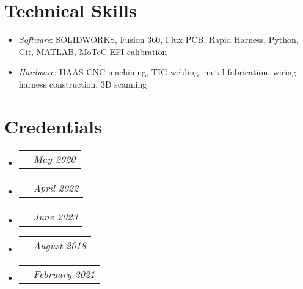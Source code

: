 \documentclass[letterpaper,11pt]{article}
\makeatletter
\newcommand{\role}[2]{
  \vspace{-5pt}\item
    \begin{tabular*}{1.0\textwidth}[t]{l@{\extracolsep{\fill}}r}
      \textit{\small#1} & \textit{\small #2} \\
    \end{tabular*}\vspace{-7pt}
}
\newcommand{\resumeItem}[1]{
  \item\small{
    {#1 \vspace{-2pt}}
  }
}
\newcommand{\credential}[2]{
  \item
    \begin{tabular*}{0.94\textwidth}[t]{l@{\extracolsep{\fill}}r}
      \text{\small#1} & \textit{\small #2} \\
    \end{tabular*}\vspace{-7pt}
}
\newcommand{\resumeItemListStart}{\begin{itemize}}
\newcommand{\resumeItemListEnd}{\end{itemize}\vspace{-5pt}}
\newcommand{\credentialListStart}{\begin{itemize}}
\newcommand{\credentialListEnd}{\end{itemize}\vspace{-5pt}}
\makeatother
\begin{document}
            
\section{Technical Skills}
    \resumeItemListStart
        \resumeItem{\textit{Software}{: SOLIDWORKS, Fusion 360, Flux PCB, Rapid Harness, Python, Git, MATLAB, MoTeC EFI calibration}} \vspace{-5pt}
        \resumeItem{\textit{Hardware}{: HAAS CNC machining, TIG welding, metal fabrication, wiring harness construction, 3D scanning}}
    \resumeItemListEnd
 \vspace{-16pt}

\section{Credentials}
    \credentialListStart
        \credential{Certified SOLIDWORKS Associate (CSWA) - Mechanical Design}{May 2020}
        \credential{Certified SOLIDWORKS Associate (CSWA) - Simulation}{April 2022}
        \credential{SCCA (Sports Car Club of America) Reg Scrutineer}{June 2023}
        \credential{Eagle Scout - Boy Scouts of America}{August 2018}
        \credential{Level 1 Alpine Certification - Professional Ski Instructors of America (PSIA) }{February 2021}
    \credentialListEnd
    
\end{document}
